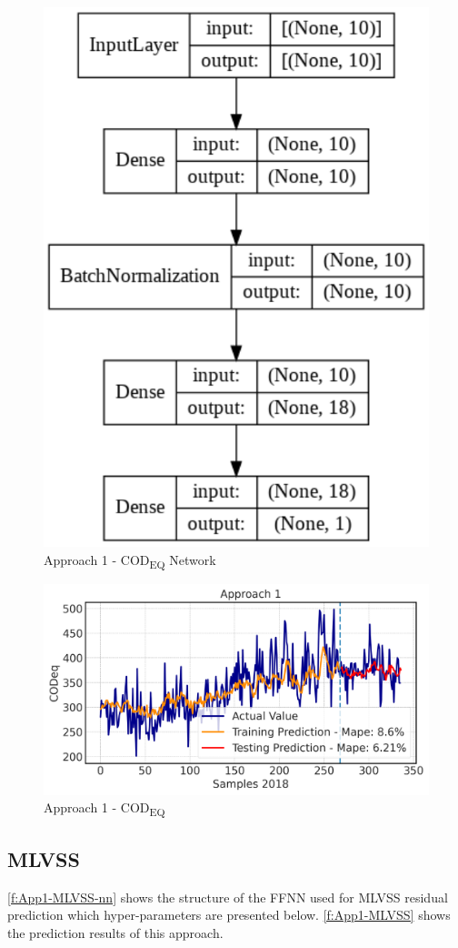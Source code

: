\begin{figure}[h]
\centering
\includegraphics[width=0.4\linewidth]{figures/Ch5/App1_CODd.pdf}
\caption{Approach 1 - COD\textsubscript{EQ} Network}
\label{f:App1-codeq-nn}
\end{figure}

\begin{figure}[h]
\centering
\includegraphics[width=\linewidth]{figures/Ch5/CODeq-1.pdf}
\caption{Approach 1 - COD\textsubscript{EQ}}
\label{f:App1-codeq}
\end{figure}

\subsection{MLVSS}

\autoref{f:App1-MLVSS-nn} shows the structure of the \ac{FFNN} used for \ac{MLVSS} residual prediction which hyper-parameters are presented below. \autoref{f:App1-MLVSS} shows the prediction results of this approach.

